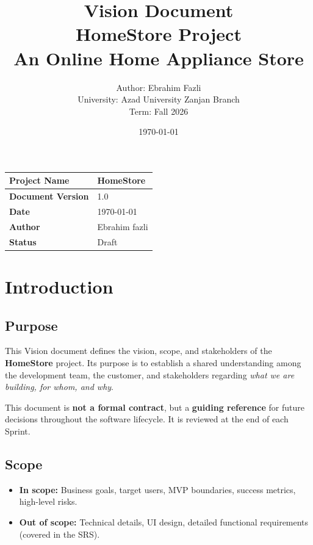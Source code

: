 \documentclass[12pt, a4paper]{article}
\title{
    \vspace{-1cm}
    \textbf{\Huge Vision Document}\\[0.3cm]
    \textbf{\LARGE HomeStore Project}\\[0.5cm]
    \large An Online Home Appliance Store
}
\author{
    Author: Ebrahim Fazli\\
    University: Azad University Zanjan Branch\\
    Term: Fall 2026
}
\date{\today}
\begin{document}
\maketitle
\thispagestyle{empty}

\vspace{1cm}

\begin{center}
\begin{tabular}{|l|l|}
\hline
\textbf{Project Name} & HomeStore \\
\hline
\textbf{Document Version} & 1.0 \\
\hline
\textbf{Date} & \today \\
\hline
\textbf{Author} & Ebrahim fazli \\
\hline
\textbf{Status} & Draft \\
\hline
\end{tabular}
\end{center}

\newpage
\tableofcontents
\newpage

\section{Introduction}

\subsection{Purpose}
This Vision document defines the vision, scope, and stakeholders of the
\textbf{HomeStore} project. Its purpose is to establish a shared understanding
among the development team, the customer, and stakeholders regarding
\emph{what we are building, for whom, and why}.

This document is \textbf{not a formal contract}, but a \textbf{guiding reference}
for future decisions throughout the software lifecycle. It is reviewed
at the end of each Sprint.

\subsection{Scope}
\begin{itemize}
    \item \textbf{In scope:} Business goals, target users, MVP boundaries, success metrics, high-level risks.
    \item \textbf{Out of scope:} Technical details, UI design, detailed functional requirements (covered in the SRS).
\end{itemize}
\end{document}
